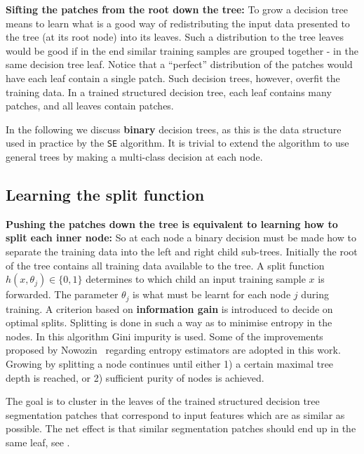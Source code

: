 \textbf{Sifting the patches from the root down the tree:} To grow a decision tree means to learn what is a good way of redistributing the input data presented to the tree (at its root node) into its leaves. Such a distribution to the tree leaves would be good if in the end similar training samples are grouped together - in the same decision tree leaf. Notice that a ``perfect'' distribution of the patches would have each leaf contain a single patch. Such decision trees, however, overfit the training data. In a trained structured decision tree, each leaf contains many patches, and all leaves contain patches.

In the following we discuss {\bf binary} decision trees, as this is the data structure used in practice by the {\tt SE} algorithm. It is trivial to extend the algorithm to use general trees by making a multi-class decision at each node. 

\subsection{Learning the split function}
\textbf{Pushing the patches down the tree is equivalent to learning how to split each inner node:} So at each node a binary decision must be made how to separate the training data into the left and right child sub-trees. Initially the root of the tree contains all training data available to the tree. A split function $h(x,\theta_j)\in\{0,1\}$ determines to which child an input training sample $x$ is forwarded. The parameter $\theta_j$ is what must be learnt for each node $j$ during training. A criterion based on {\bf information gain} is introduced to decide on optimal %
splits. Splitting is done in such a way as to %
minimise entropy in the nodes. In this algorithm Gini impurity is used. Some of the improvements proposed by Nowozin~\cite{Nowozin12improvedinformation,nowozin2014decision} regarding entropy estimators are adopted in this work. Growing by splitting a node continues until either 1) a certain maximal tree depth is reached, or 2) sufficient purity of nodes is achieved.

The goal is to cluster in the leaves of the trained structured decision tree segmentation patches that correspond to input features which are as similar as possible. The net %
effect is that similar segmentation patches should end up in the same leaf, see .

